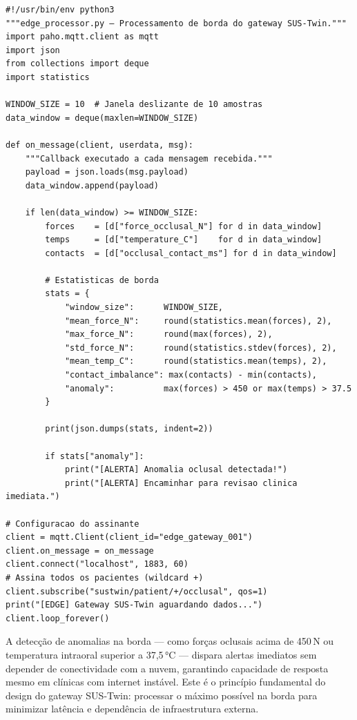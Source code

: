\begin{lstlisting}[style=pythonstyle, caption=Assinante MQTT com processamento de borda e detecção de anomalias, label=cod:edge]
#!/usr/bin/env python3
"""edge_processor.py — Processamento de borda do gateway SUS-Twin."""
import paho.mqtt.client as mqtt
import json
from collections import deque
import statistics

WINDOW_SIZE = 10  # Janela deslizante de 10 amostras
data_window = deque(maxlen=WINDOW_SIZE)

def on_message(client, userdata, msg):
    """Callback executado a cada mensagem recebida."""
    payload = json.loads(msg.payload)
    data_window.append(payload)

    if len(data_window) >= WINDOW_SIZE:
        forces    = [d["force_occlusal_N"] for d in data_window]
        temps     = [d["temperature_C"]    for d in data_window]
        contacts  = [d["occlusal_contact_ms"] for d in data_window]

        # Estatisticas de borda
        stats = {
            "window_size":      WINDOW_SIZE,
            "mean_force_N":     round(statistics.mean(forces), 2),
            "max_force_N":      round(max(forces), 2),
            "std_force_N":      round(statistics.stdev(forces), 2),
            "mean_temp_C":      round(statistics.mean(temps), 2),
            "contact_imbalance": max(contacts) - min(contacts),
            "anomaly":          max(forces) > 450 or max(temps) > 37.5
        }

        print(json.dumps(stats, indent=2))

        if stats["anomaly"]:
            print("[ALERTA] Anomalia oclusal detectada!")
            print("[ALERTA] Encaminhar para revisao clinica imediata.")

# Configuracao do assinante
client = mqtt.Client(client_id="edge_gateway_001")
client.on_message = on_message
client.connect("localhost", 1883, 60)
# Assina todos os pacientes (wildcard +)
client.subscribe("sustwin/patient/+/occlusal", qos=1)
print("[EDGE] Gateway SUS-Twin aguardando dados...")
client.loop_forever()
\end{lstlisting}

A detecção de anomalias na borda --- como forças oclusais acima de 450\,N ou temperatura intraoral superior a 37,5\,°C --- dispara alertas imediatos sem depender de conectividade com a nuvem, garantindo capacidade de resposta mesmo em clínicas com internet instável. Este é o princípio fundamental do design do gateway SUS-Twin: processar o máximo possível na borda para minimizar latência e dependência de infraestrutura externa.

